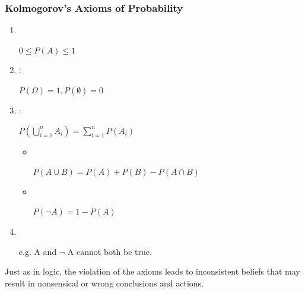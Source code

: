 \documentclass[
../EiKI_Summary.tex,
]
{subfiles}
\begin{document}
\subsubsection{Kolmogorov's Axioms of Probability}
\begin{enumerate}
    \item {}\\
    \begin{smallmathbox*}
        $0 \leq P(A) \leq 1$
    \end{smallmathbox*}
    \item {}:\\
    \begin{smallmathbox*}
        $P(\Omega) = 1, P(\emptyset) = 0$
    \end{smallmathbox*}
    \item {}:\\
    \begin{smallmathbox*}
        $P(\bigcup_{i=1}^n A_i) = \sum_{i=1}^n P(A_i)$
    \end{smallmathbox*}
    \begin{itemize}[label=$\rightarrow$]
        \item {}\\
            \begin{smallmathbox*}
                $P(A \cup B) = P(A) + P(B) - P(A \cap B)$
            \end{smallmathbox*}
        \item {}\\
            \begin{smallmathbox*}
                $P(\neg A) = 1 - P(A)$
            \end{smallmathbox*}
    \end{itemize}
    \item {}\\
    \begin{smalldefbox*}
        e.g. A and $\neg$ A cannot both be true.
    \end{smalldefbox*}
\end{enumerate}

Just as in logic, the violation of the axioms leads to inconsistent beliefs that may result in nonsensical or wrong conclusions and actions.
\end{document}
